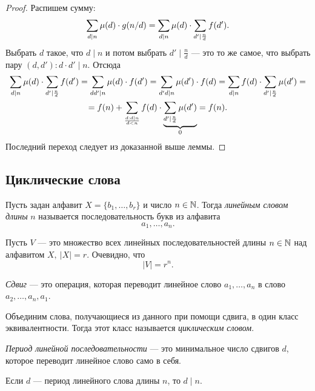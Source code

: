 \begin{proof}
	Распишем сумму:
	\[
		\sum\limits_{d \mid n} \mu(d) \cdot g(n / d) = \sum\limits_{d \mid n} \mu(d) \cdot \sum\limits_{d' \mid \frac{n}{d}} f(d').
	\]
	Выбрать $d$ такое, что $d \mid n$ и потом выбрать $d' \mid \frac{n}{d}$ --- это то же самое, что выбрать пару $(d, d'): d \cdot d' \mid n$. Отсюда
	\begin{multline*}
		\sum\limits_{d \mid n} \mu(d) \cdot \sum\limits_{d' \mid \frac{n}{d}} f(d') = \sum\limits_{dd' \mid n} \mu(d) \cdot f(d') = \sum\limits_{d'd \mid n} \mu(d') \cdot f(d) = \sum\limits_{d \mid n} f(d) \cdot \sum\limits_{d' \mid \frac{n}{d}} \mu(d') =
		\\ =
		f(n) + \sum\limits_{{d: d \mid n} \over d < n} f(d) \cdot \underbrace{\sum\limits_{d' \mid \frac{n}{d}} \mu(d')}_{0} = f(n).
	\end{multline*}
	Последний переход следует из доказанной выше леммы.
\end{proof}

\subsection{Циклические слова}

\begin{definition}
	Пусть задан алфавит $X = \{b_1, \ldots, b_r\}$ и число $n \in \mathbb{N}$. Тогда \textit{линейным словом длины} $n$ называется последовательность букв из алфавита
	\[
		a_1, \ldots, a_n.
	\]
\end{definition}

Пусть $V$ --- это множество всех линейных последовательностей длины $n \in \mathbb{N}$ над алфавитом $X,\ |X| = r$. Очевидно, что
\[
	|V| = r^n.
\]

\begin{definition}
	\textit{Сдвиг} --- это операция, которая переводит линейное слово $a_1, \ldots, a_n$ в слово $a_2, \ldots, a_n, a_1$.
\end{definition}

\begin{definition}
	Объединим слова, получающиеся из данного при помощи сдвига, в один класс эквивалентности. Тогда этот класс называется \textit{циклическим словом}.
\end{definition}

\begin{definition}
	\textit{Период линейной последовательности} --- это минимальное число сдвигов $d$, которое переводит линейное слово само в себя.
\end{definition}

\begin{lemma}
	Если $d$ --- период линейного слова длины $n$, то $d \mid n$.
\end{lemma}

